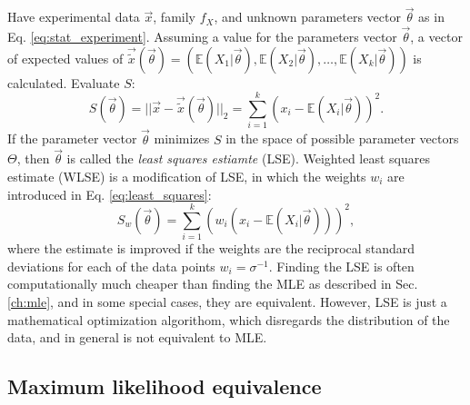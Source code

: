 Have experimental data $\vec{x}$, family $f_X$, and unknown parameters vector $\vec{\theta}$ as in Eq. \ref{eq:stat_experiment}. Assuming a value for the parameters vector $\vec{{\theta}}$, a vector of expected values of $\vec{\tilde{x}}(\vec{{\theta}}) = (\mathbb{E}(X_1|\vec{\theta}),\mathbb{E}(X_2|\vec{\theta}),\dots,\mathbb{E}(X_k|\vec{\theta}))$ is calculated. Evaluate $S$:
\begin{equation}
    S(\vec{{\theta}}) = || \vec{x} - \vec{\tilde{x}}(\vec{{\theta}}) ||_2 = \sum_{i=1}^{k} \left( x_i - \mathbb{E}(X_i|\vec{\theta}) \right)^2. \label{eq:least_squares}
\end{equation}
If the parameter vector $\vec{{\theta}}$ minimizes $S$ in the space of possible parameter vectors $\Theta$, then $\vec{{\theta}}$ is called the \textit{least squares estiamte} (LSE). Weighted least squares estimate (WLSE) is a modification of LSE, in which the weights $w_i$ are introduced in Eq. \ref{eq:least_squares}:
\begin{equation}
     S_w(\vec{{\theta}}) = \sum_{i=1}^{k} \left( w_i \left( x_i - \mathbb{E}(X_i|\vec{\theta}) \right) \right)^2, \label{eq:weighted_least_squares}
\end{equation}
where the estimate is improved if the weights are the reciprocal standard deviations for each of the data points $w_i = \sigma^{-1}$. Finding the LSE is often computationally much cheaper than finding the MLE as described in Sec. \ref{ch:mle}, and in some special cases, they are equivalent. However, LSE is just a mathematical optimization algorithom, which disregards the distribution of the data, and in general is not equivalent to MLE. 

\subsection{Maximum likelihood equivalence}

